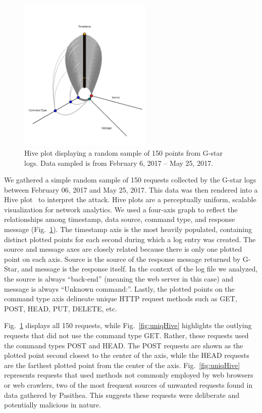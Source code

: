 \begin{figure}[b]
   \centering
   \includegraphics[width=2.5in]{images/regHive.png} 
   \caption{Hive plot displaying a random sample of 150 points from G-star logs. Data sampled is from February 6, 2017 -- May 25, 2017.}
   \label{fig:regHive}
\end{figure}
We gathered a simple random sample of 150 requests collected by the G-star logs between February 06, 2017 and May 25, 2017.  
This data was then rendered into a Hive plot~\cite{Hive-Plot} to interpret the attack. 
Hive plots are a perceptually uniform, scalable visualization for network analytics.  
We used a four-axis graph to reflect the relationships among timestamp, data source, command type, and response message (Fig.~\ref{fig:regHive}). 
The timestamp axis is the most heavily populated, containing distinct plotted points for each second during which a log entry was created. 
The source and message axes are closely related because there is only one plotted point on each axis. 
Source is the source of the response message returned by G-Star, and message is the response itself. 
In the context of the log file we analyzed, the source is always ``back-end'' (meaning the web server in this case) and message is always ``Unknown command:''. 
Lastly, the plotted points on the command type axis delineate unique HTTP request methods such as GET, POST, HEAD, PUT, DELETE, etc.

Fig.~\ref{fig:regHive} displays all 150 requests, while Fig.~\ref{fig:uniqHive} highlights the outlying requests that did not use the command type GET.  
Rather, these requests used the command types POST and HEAD. 
The POST requests are shown as the plotted point second closest to the center of the axis, while the HEAD requests are the farthest plotted point from the center of the axis. 
Fig.~\ref{fig:uniqHive} represents requests that used methods not commonly employed by web browsers or web crawlers, two of the most frequent sources of unwanted requests found in data gathered by Pasithea. 
This suggests these requests were deliberate and potentially malicious in nature.

